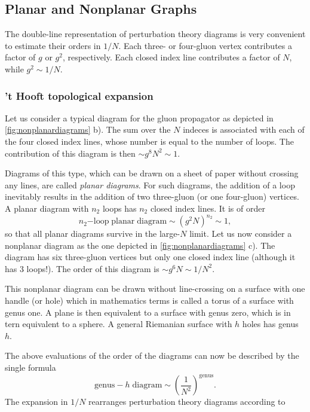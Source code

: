 \subsection{Planar and Nonplanar Graphs}
The double-line representation of perturbation theory diagrams is very
convenient to estimate their orders in $1/N$. Each three- or four-gluon vertex
contributes a factor of $g$ or $g^2$, respectively. Each closed index line
contributes a factor of $N$, while $g^2\sim 1/N$.
\subsubsection{'t Hooft topological expansion}
Let us consider a typical diagram for the gluon propagator as depicted in
\ref{fig:nonplanardiagrams} b). The sum over the $N$ indeces is associated with
each of the four closed index lines, whose number is equal to the number of
loops. The contribution of this diagram is then $\sim g^8N^2\sim 1$.
\par Diagrams of this type, which can be drawn on a sheet of paper without
crossing any lines, are called \textit{planar diagrams}. For such diagrams, the
addition of a loop inevitably results in the addition of two three-gluon (or
one four-gluon) vertices. A planar diagram with $n_2$ loops has $n_2$ closed
index lines. It is of order
\begin{equation}
  n_2\mathrm{-loop}\;\mathrm{planar}\;\mathrm{diagram}\sim(g^2N)^{n_2}\sim 1,
\end{equation}
so that all planar diagrams survive in the large-$N$ limit. Let us now consider
a nonplanar diagram as the one depicted in \ref{fig:nonplanardiagrams} c). The
diagram has six three-gluon vertices but only one closed index line (although
it has 3 loops!). The order of this diagram is $\sim g^6N\sim 1/N^2$.
\par This nonplanar diagram can be drawn without line-crossing on a surface
with one handle (or hole) which in mathematics terms is called a torus of
a surface with genus one. A plane is then equivalent to a surface with genus
zero, which is in tern equivalent to a sphere. A general Riemanian surface with
$h$ holes has genus $h$.
\par The above evaluations of the order of the diagrams can now be described by
the single formula
\begin{equation}
  \mathrm{genus}-h\;\mathrm{diagram} \sim \left(\frac{1}{N^2}\right)^{\mathrm{genus}}.
  \label{eq:genusformula}
\end{equation}
The expansion in $1/N$ rearranges perturbation theory diagrams according to
